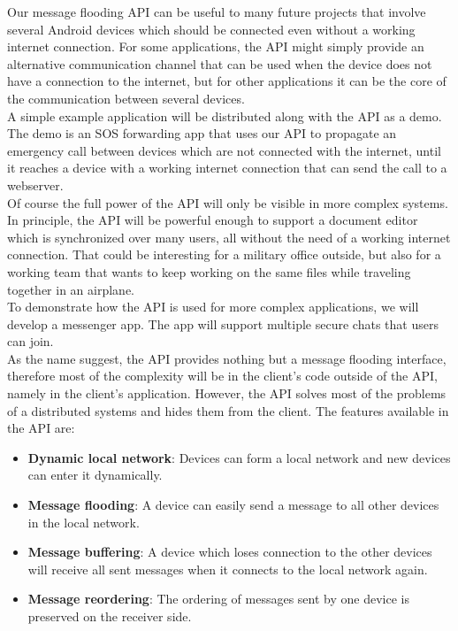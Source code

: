 Our message flooding API can be useful to many future projects that involve several Android devices which should be connected even without a working internet connection. For some applications, the API might simply provide an alternative communication channel that can be used when the device does not have a connection to the internet, but for other applications it can be the core of the communication between several devices. \\
A simple example application will be distributed along with the API as a demo. The demo is an SOS forwarding app that uses our API to propagate an emergency call between devices which are not connected with the internet, until it reaches a device with a working internet connection that can send the call to a webserver. \\
Of course the full power of the API will only be visible in more complex systems. In principle, the API will be powerful enough to support a document editor which is synchronized over many users, all without the need of a working internet connection. That could be interesting for a military office outside, but also for a working team that wants to keep working on the same files while traveling together in an airplane.\\
To demonstrate how the API is used for more complex applications, we will develop a messenger app. The app will support multiple secure chats that users can join. \\
As the name suggest, the API provides nothing but a message flooding interface, therefore most of the complexity will be in the client's code outside of the API, namely in the client's application. However, the API solves most of the problems of a distributed systems and hides them from the client. The features available in the API are:
\begin{itemize}
	\item {\bf Dynamic local network}: Devices can form a local network and new devices can enter it dynamically.
	\item {\bf Message flooding}: A device can easily send a message to all other devices in the local network.
	\item {\bf Message buffering}: A device which loses connection to the other devices will receive all sent messages when it connects to the local network again.
	\item {\bf Message reordering}: The ordering of messages sent by one device is preserved on the receiver side.
\end{itemize}
